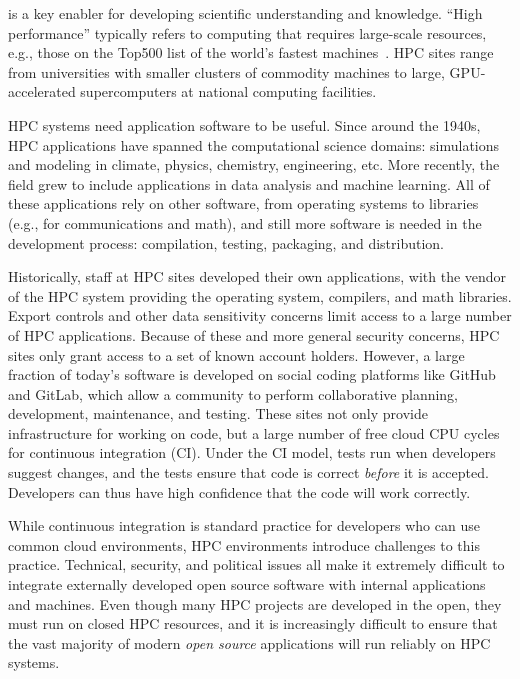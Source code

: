 \documentclass{IEEEcsmag}
\begin{document}
 is a key enabler for developing scientific understanding and knowledge.
``High performance'' typically refers to computing that requires large-scale
resources, e.g., those on the Top500 list of the world's fastest machines~\cite{top500}.
HPC sites range from universities with smaller clusters of commodity machines to large,
GPU-accelerated supercomputers at national computing facilities.

HPC systems need application software to be useful. Since around the 1940s, HPC
applications have spanned the computational science domains: simulations and modeling in
climate, physics, chemistry, engineering, etc. More recently, the field grew
to include applications in data analysis and machine learning.
All of these applications rely on other software, from operating systems to libraries
(e.g., for communications and math), and still more software is needed in the development
process: compilation, testing, packaging, and distribution.

Historically, staff at HPC sites developed their own applications, with the vendor of the
HPC system providing the operating system, compilers, and math libraries. Export controls and
other data sensitivity concerns limit access to a large number of HPC applications.
Because of these and more general security concerns, HPC sites only grant access to a set
of known account holders. However, a large fraction of
today's software is developed on social coding platforms like GitHub and GitLab, which
allow a community to perform collaborative planning, development, maintenance, and
testing. These sites not only provide infrastructure for working on code, but a large
number of free cloud CPU cycles for continuous integration (CI). Under the CI model,
tests run when developers suggest changes, and the tests ensure that code is
correct {\it before} it is accepted. Developers can thus have high confidence that
the code will work correctly.

While continuous integration is standard practice for developers who can use common
cloud environments, HPC environments introduce challenges to this practice. Technical,
security, and political issues all make it extremely difficult to integrate externally
developed open source software with internal applications and machines. Even though many
HPC projects are developed in the open, they must run on closed HPC resources, and it is
increasingly difficult to ensure that the vast majority of modern {\it open source}
applications will run reliably on HPC systems.
\end{document}

